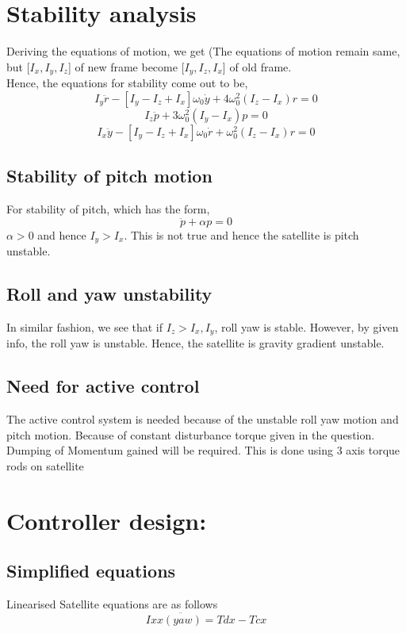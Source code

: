 \documentclass[10pt,a4paper]{report}
\begin{document}
\chapter{Stability analysis}
Deriving the equations of motion, we get (The equations of motion remain same, but [$I_{x},I_{y},I_{z}$] of new frame become [$I_{y},I_{z},I_{x}$] of old frame.\\
Hence, the equations for stability come out to be,
\begin{equation}
I_{y}\ddot{r}-[I_{y}-I_{z}+I_{x}]\omega_{0}\dot{y}+4\omega_{0}^{2}(I_{z}-I_{x})r=0
\end{equation}
\begin{equation}
I_{z}\ddot{p}+3\omega_{0}^{2}(I_{y}-I_{x})p=0
\end{equation}
\begin{equation}
I_{x}\ddot{y}-[I_{y}-I_{z}+I_{x}]\omega_{0}\dot{r}+\omega_{0}^{2}(I_{z}-I_{x})r=0
\end{equation}

\section{Stability of pitch motion}
For stability of pitch, which has the form,
\begin{equation}
\ddot{p}+\alpha p=0
\end{equation}
$ \alpha>0 $ and hence $ I_{y}>I_{x} $. This is not true and hence the satellite is pitch unstable.
\section{Roll and yaw unstability}
In similar fashion, we see that if $ I_{z}>I_{x},I_{y} $, roll yaw is stable. However, by given info, the roll yaw is unstable. Hence, the satellite is gravity gradient unstable. 
\section{Need for active control}
The active control system is needed because of the unstable roll yaw motion and pitch motion. Because of constant disturbance torque given in the question. Dumping of Momentum gained will be required. This is done using 3 axis torque rods on satellite
\chapter{Controller design:}
\section{Simplified equations}
Linearised Satellite equations are as follows
\[
Ixx\ddot{(yaw)}=Tdx-Tcx
\]
\end{document}
